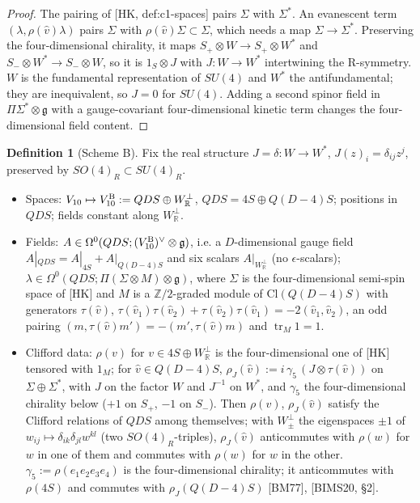 \documentclass[11pt]{article}
\theoremstyle{definition}
\newtheorem{definition}{Definition}[section]
\numberwithin{equation}{section}
\begin{document}
\begin{proof}
The pairing of [HK, def:c1-spaces] pairs $\Sigma$ with $\Sigma^*$. An evanescent term $(\lambda,\rho(\hat v)\lambda)$ pairs $\Sigma$ with $\rho(\hat v)\Sigma\subset\Sigma$, which needs a map $\Sigma\to\Sigma^*$. Preserving the four-dimensional chirality, it maps $S_+\otimes W\to S_+\otimes W^*$ and $S_-\otimes W^*\to S_-\otimes W$, so it is $1_{S}\otimes J$ with $J\colon W\to W^*$ intertwining the R-symmetry. $W$ is the fundamental representation of $SU(4)$ and $W^*$ the antifundamental; they are inequivalent, so $J=0$ for $SU(4)$. Adding a second spinor field in $\Pi\Sigma^*\otimes\mathfrak g$ with a gauge-covariant four-dimensional kinetic term changes the four-dimensional field content.
\end{proof}

\begin{definition}[Scheme B]
\label{def:schemeB}
Fix the real structure $J=\delta\colon W\to W^*$, $J(z)_i=\delta_{ij}z^j$, preserved by $SO(4)_R\subset SU(4)_R$.
\begin{itemize}
\item Spaces: $V_{10}\mapsto V_{10}^{\rm B}:=QDS\oplus W^\perp_{\mathbb R}$, $QDS=4S\oplus Q(D{-}4)S$; positions in $QDS$; fields constant along $W^\perp_{\mathbb R}$.
\item Fields: $A\in\Omega^0(QDS;(V_{10}^{\rm B})^\vee\otimes\mathfrak g)$, i.e. a $D$-dimensional gauge field $A|_{QDS}=A|_{4S}+A|_{Q(D-4)S}$ and six scalars $A|_{W^\perp_{\mathbb R}}$ (no $\epsilon$-scalars); $\lambda\in\Omega^0(QDS;\Pi(\Sigma\otimes M)\otimes\mathfrak g)$, where $\Sigma$ is the four-dimensional semi-spin space of [HK] and $M$ is a $\mathbb Z/2$-graded module of $\mathrm{Cl}(Q(D{-}4)S)$ with generators $\tau(\hat v)$, $\tau(\hat v_1)\tau(\hat v_2)+\tau(\hat v_2)\tau(\hat v_1)=-2(\hat v_1,\hat v_2)$, an odd pairing $(m,\tau(\hat v)m')=-(m',\tau(\hat v)m)$ and $\operatorname{tr}_M1=1$.
\item Clifford data: $\rho(v)$ for $v\in 4S\oplus W^\perp_{\mathbb R}$ is the four-dimensional one of [HK] tensored with $1_M$; for $\hat v\in Q(D{-}4)S$, $\rho_J(\hat v):=i\,\gamma_5\,(J\otimes\tau(\hat v))$ on $\Sigma\oplus\Sigma^*$, with $J$ on the factor $W$ and $J^{-1}$ on $W^*$, and $\gamma_5$ the four-dimensional chirality below ($+1$ on $S_+$, $-1$ on $S_-$). Then $\rho(v)$, $\rho_J(\hat v)$ satisfy the Clifford relations of $QDS$ among themselves; with $W^\perp_\pm$ the eigenspaces $\pm1$ of $w_{ij}\mapsto\delta_{ik}\delta_{jl}w^{kl}$ (two $SO(4)_R$-triples), $\rho_J(\hat v)$ anticommutes with $\rho(w)$ for $w$ in one of them and commutes with $\rho(w)$ for $w$ in the other. $\gamma_5:=\rho(e_1e_2e_3e_4)$ is the four-dimensional chirality; it anticommutes with $\rho(4S)$ and commutes with $\rho_J(Q(D{-}4)S)$ [BM77], [BIMS20, §2].

\end{itemize}
\end{definition}
\end{document}
